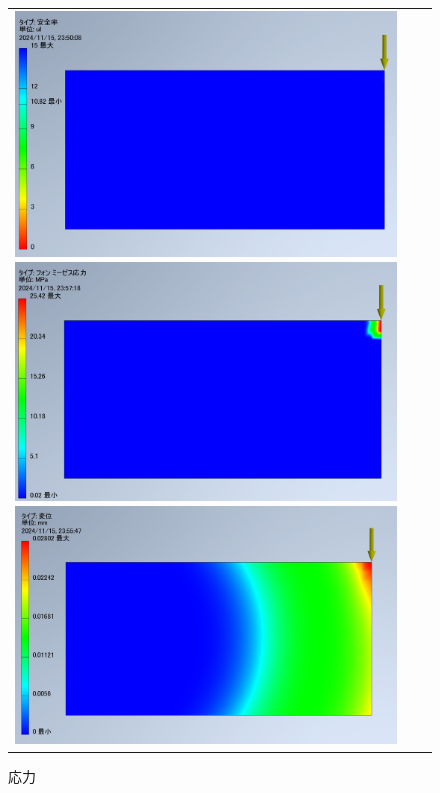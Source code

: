   \begin{figure}[H]
    \begin{tabular}{ccc}
      \begin{minipage}{.33\textwidth}
        \centering
        \includegraphics[width=0.99\linewidth]{images/model_1/safe.png}
        \caption{安全率}
        \label{img:safe1}
      \end{minipage}
      \begin{minipage}{.33\textwidth}
        \centering
        \includegraphics[width=0.99\linewidth]{images/model_1/voms.png}
        \caption{応力}
        \label{img:voms1}
      \end{minipage}
      \begin{minipage}{.33\textwidth}
        \centering
        \includegraphics[width=0.99\linewidth]{images/model_1/disp.png}

\end{minipage}
\end{tabular}
\end{figure}
